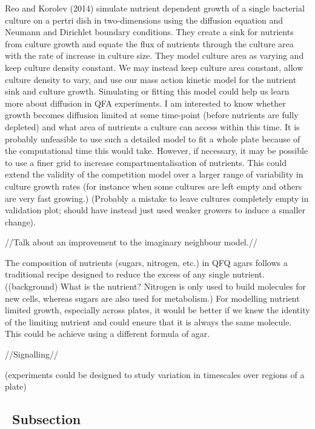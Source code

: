 Reo and Korolev (2014) simulate nutrient dependent growth of a single
bacterial culture on a pertri dish in two-dimensions using the
diffusion equation and Neumann and Dirichlet boundary conditions. They
create a sink for nutrients from culture growth and equate the flux of
nutrients through the culture area with the rate of increase in
culture size. They model culture area as varying and keep culture
density constant. We may instead keep culture area constant, allow
culture density to vary, and use our mass action kinetic model for the
nutrient sink and culture growth. Simulating or fitting this model
could help us learn more about diffusion in QFA experiments. I am
interested to know whether growth becomes diffusion limited at some
time-point (before nutrients are fully depleted) and what area of
nutrients a culture can access within this time. It is probably
unfeasible to use such a detailed model to fit a whole plate because
of the computational time this would take. However, if necessary, it
may be possible to use a finer grid to increase compartmentalisation
of nutrients. This could extend the validity of the competition model
over a larger range of variability in culture growth rates (for
instance when some cultures are left empty and others are very fast
growing.) (Probably a mistake to leave cultures completely empty in
validation plot; should have instead just used weaker growers to
induce a smaller change).


//Talk about an improvement to the imaginary neighbour model.//

The composition of nutrients (sugars, nitrogen, etc.) in QFQ agars
follows a traditional recipe designed to reduce the excess of any
single nutrient. ((background) What is the nutrient?  Nitrogen is only
used to build molecules for new cells, whereas sugars are also used
for metabolism.) For modelling nutrient limited growth, especially
across plates, it would be better if we knew the identity of the
limiting nutrient and could ensure that it is always the same
molecule. This could be achieve using a different formula of agar.

//Signalling//



(experiments could be designed to study variation in timescales over
regions of a plate)


\subsection{\thesubsection~Subsection}

